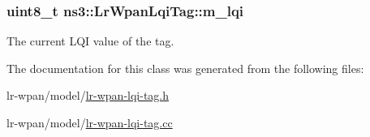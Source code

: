 \subsubsection[{\texorpdfstring{m\+\_\+lqi}{m_lqi}}]{\setlength{\rightskip}{0pt plus 5cm}uint8\+\_\+t ns3\+::\+Lr\+Wpan\+Lqi\+Tag\+::m\+\_\+lqi\hspace{0.3cm}{\ttfamily [private]}}\hypertarget{classns3_1_1LrWpanLqiTag_a4dd6420be4afefcbfe7ba0f60b360da0}{}\label{classns3_1_1LrWpanLqiTag_a4dd6420be4afefcbfe7ba0f60b360da0}
The current L\+QI value of the tag. 

The documentation for this class was generated from the following files\+:\begin{DoxyCompactItemize}
\item 
lr-\/wpan/model/\hyperlink{lr-wpan-lqi-tag_8h}{lr-\/wpan-\/lqi-\/tag.\+h}\item 
lr-\/wpan/model/\hyperlink{lr-wpan-lqi-tag_8cc}{lr-\/wpan-\/lqi-\/tag.\+cc}\end{DoxyCompactItemize}

